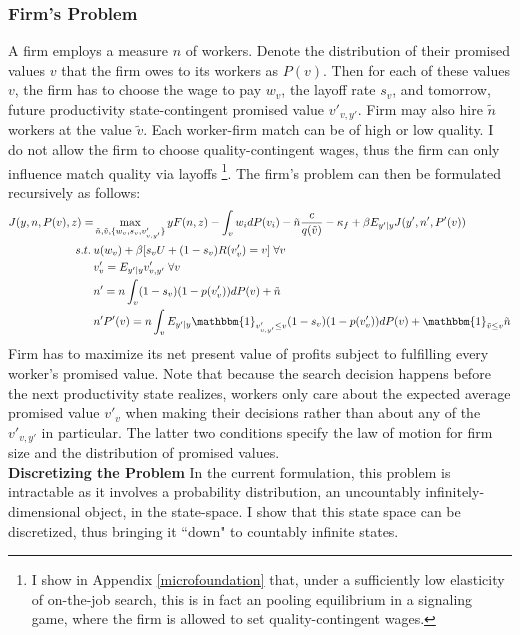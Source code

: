 \subsubsection*{Firm's Problem}
A firm employs a measure $n$ of workers. Denote the distribution of their promised values $v$ that the firm owes to its workers as $P(v)$. Then for each of these values $v$, the firm has to choose the wage to pay $w_v$, the layoff rate $s_v$, and tomorrow, future productivity state-contingent promised value $v'_{v,y'}$. Firm may also hire $\tilde{n}$ workers at the value $\tilde{v}$. Each worker-firm match can be of high or low quality. I do not allow the firm to choose quality-contingent wages, thus the firm can only influence match quality via layoffs \footnote{I show in Appendix \ref{microfoundation} that, under a sufficiently low elasticity of on-the-job search, this is in fact an pooling equilibrium in a signaling game, where the firm is allowed to set quality-contingent wages.}.
The firm's problem can then be formulated recursively as follows:
\begin{equation*}
    \begin{split}
    J(y,n,P(v),z) = & \max_{\tilde{n},\tilde{v},\{w_v,s_v,v'_{v,y'}\}} yF(n,z) - \int_v w_i dP(v_i) -\tilde{n}\frac{c}{q(\tilde{v})} -\kappa_f+ \beta E_{y'|y} J(y',n',P'(v)) \\
     s.t. \: & u(w_v) + \beta [s_v U + (1-s_v)R(v'_{v})=v] \; \forall v \\
    & v'_v = E_{y'|y} v'_{v,y'} \; \forall v \\
    & n' = n\int_v (1-s_v)(1-p(v'_v))dP(v)+\tilde{n} \\
    & n'P'(v) = n\int_v E_{y'|y}\mathbbm{1}_{v'_{v,y'}\leq v} (1-s_v)(1-p(v'_v))dP(v)+\mathbbm{1}_{\tilde{v}\leq v}\tilde{n}
    \end{split}
\end{equation*}
Firm has to maximize its net present value of profits subject to fulfilling every worker's promised value. 
Note that because the search decision happens before the next productivity state realizes, workers only care about the expected average promised value $v'_v$ when making their decisions rather than about any of the $v'_{v,y'}$ in particular. The latter two conditions specify the law of motion for firm size and the distribution of promised values. \\
\textbf{Discretizing the Problem} \label{subsection:discrete} In the current formulation, this problem is intractable as it involves a probability distribution, an uncountably infinitely-dimensional object, in the state-space. I show that this state space can be discretized, thus bringing it ``down" to countably infinite states.\\
